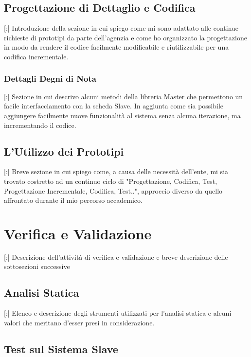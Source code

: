 \subsection{Progettazione di Dettaglio e Codifica}

[:] Introduzione della sezione in cui spiego come mi sono adattato alle continue richieste di prototipi da parte dell'agenzia e come ho organizzato la progettazione in modo da rendere il codice facilmente modificabile e riutilizzabile per una codifica incrementale.

\subsubsection{Dettagli Degni di Nota}

[:] Sezione in cui descrivo alcuni metodi della libreria Master che permettono un facile interfacciamento con la scheda Slave. In aggiunta come sia possibile aggiungere facilmente nuove funzionalità al sistema senza alcuna iterazione, ma incrementando il codice.

\subsection{L'Utilizzo dei Prototipi}

[:] Breve sezione in cui spiego come, a causa delle necessità dell'ente, mi sia trovato costretto ad un continuo ciclo di "Progettazione, Codifica, Test, Progettazione Incrementale, Codifica, Test..", approccio diverso da quello affrontato durante il mio percorso accademico.

\section{Verifica e Validazione}

[:] Descrizione dell'attività di verifica e validazione e breve descrizione delle sottosezioni successive

\subsection{Analisi Statica}

[:] Elenco e descrizione degli strumenti utilizzati per l'analisi statica e alcuni valori che meritano d'esser presi in considerazione.

\subsection{Test sul Sistema Slave}

